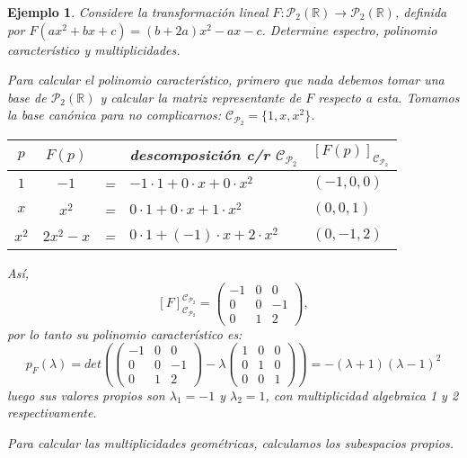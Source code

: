 \documentclass[12pt]{book}
\newtheorem{ejem}{Ejemplo}
\def\R{\mathbb{R}}
\def\P{\mathcal{P}}
\def\Ccal{\mathcal{C}}
\begin{document}
\begin{ejem} Considere la transformación lineal $F:\P_2(\R)\rightarrow\P_2(\R)$, definida por $F(ax^2+bx+c)=(b+2a)x^2-ax-c$.
Determine espectro, polinomio característico y multiplicidades.
{\em 

Para calcular el polinomio característico, primero que nada debemos tomar una base de $ \P_2(\R)$ y calcular la matriz representante de $F$ respecto a esta.
Tomamos la base canónica para no complicarnos: $\Ccal_{\P_2}=\{1,x,x^2\}$.

\begin{tabular}{c|ccl|l}
$p$&$F(p)$&&descomposición c/r $\Ccal_{\P_2}$&$[F(p)]_{\Ccal_{\P_2}}$\\\hline
$1$ & $-1$ &=&$-1\cdot1+0\cdot x+0\cdot x^2$& $(-1,0,0)$\\
$x$& $x^2$&=&$0\cdot1+0\cdot x+1\cdot x^2$& $(0,0,1)$\\
$x^2$&$2x^2-x$&=&$0\cdot1+(-1)\cdot x+2\cdot x^2$& $(0,-1,2)$\\
\end{tabular}

Así,
$$[F]_{\Ccal_{\P_2}}^{\Ccal_{\P_2}}=\left(\begin{matrix} -1 & 0 & 0 \\ 0 & 0 & -1 \\ 0 & 1 & 2 \end{matrix}\right),$$
por lo tanto su polinomio característico es:
$$p_F(\lambda)=det\left(\left(\begin{matrix} -1 & 0 & 0 \\ 0 & 0 & -1 \\ 0 & 1 & 2 \end{matrix}\right)-\lambda\left(\begin{matrix} 1 & 0 & 0 \\ 0 & 1 & 0 \\ 0 & 0 & 1 \end{matrix}\right)\right)=-(\lambda+1)(\lambda-1)^2$$
luego sus valores propios son $\lambda_1=-1$ y $\lambda_2=1$, con multiplicidad algebraica 1 y 2 respectivamente.

Para calcular las multiplicidades geométricas, calculamos los subespacios propios.

}
\end{ejem}
\end{document}
